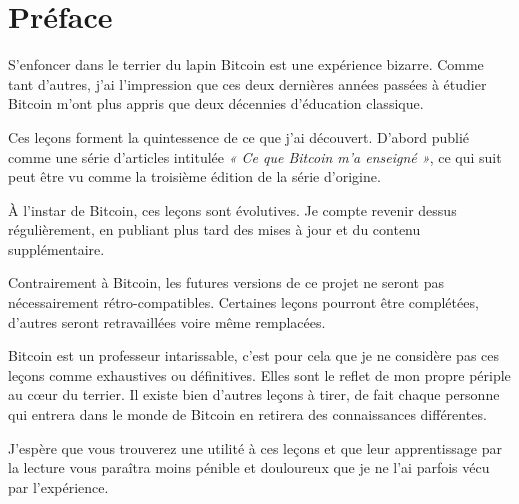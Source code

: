 \chapter*{Préface}

S'enfoncer dans le terrier du lapin Bitcoin est une expérience bizarre. Comme
tant d'autres, j'ai l'impression que ces deux dernières années passées à étudier
Bitcoin m'ont plus appris que deux décennies d'éducation classique.

Ces leçons forment la quintessence de ce que j'ai découvert. D'abord publié
comme une série d'articles intitulée \textit{« Ce que Bitcoin m'a enseigné »},
ce qui suit peut être vu comme la troisième édition de la série d'origine.

À l'instar de Bitcoin, ces leçons sont évolutives. Je compte revenir dessus
régulièrement, en publiant plus tard des mises à jour et du contenu
supplémentaire.

Contrairement à Bitcoin, les futures versions de ce projet ne seront pas
nécessairement rétro-compatibles. Certaines leçons pourront être complétées,
d'autres seront retravaillées voire même remplacées.

Bitcoin est un professeur intarissable, c'est pour cela que je ne considère pas
ces leçons comme exhaustives ou définitives. Elles sont le reflet de mon propre
périple au cœur du terrier. Il existe bien d'autres leçons à tirer, de fait
chaque personne qui entrera dans le monde de Bitcoin en retirera des
connaissances différentes.

J'espère que vous trouverez une utilité à ces leçons et que leur apprentissage
par la lecture vous paraîtra moins pénible et douloureux que je ne l'ai parfois
vécu par l'expérience.

%
%
